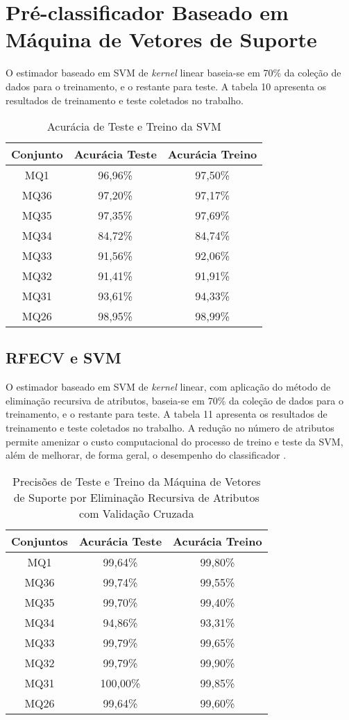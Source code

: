\documentclass[12pt,oneside,a4paper,chapter=TITLE,section=TITLE,sumario=tradicional,english,brazil]{abntex2}
\begin{document}
\section{Pré-classificador Baseado em Máquina de Vetores de Suporte}
O estimador baseado em SVM de \textit{kernel} linear baseia-se em 70\% da coleção de dados para o treinamento, e o restante para teste. A tabela 10  apresenta os resultados de treinamento e teste coletados no trabalho.\par 
\begin{table}[h]
\centering
\caption{Acurácia de Teste e Treino da SVM}
\begin{tabular}{c|c|c}
\toprule
   Conjunto &       Acurácia Teste &       Acurácia Treino \\
\midrule
 MQ1&	96,96\%&	97,50\%\\
MQ36&	97,20\%&	97,17\%\\
MQ35&	97,35\%&	97,69\%\\
MQ34&	84,72\%&	84,74\%\\
MQ33&	91,56\%&	92,06\%\\
MQ32&	91,41\%&	91,91\%\\
MQ31&	93,61\%&	94,33\%\\
MQ26&	98,95\%&	98,99\%\\
\bottomrule
\end{tabular}
\end{table}
\par 

\subsection{RFECV e SVM}
O estimador baseado em SVM de \textit{kernel} linear, com aplicação do método de eliminação recursiva de atributos, baseia-se em 70\% da coleção de dados para o treinamento, e o restante para teste. A tabela 11 apresenta os resultados de treinamento e teste coletados no trabalho. A redução no número de atributos permite amenizar o custo computacional do processo de treino e teste da SVM, além de melhorar, de forma geral, o desempenho do classificador \cite{guyon2003}. \par 

\begin{table}[h]
\centering
\caption{Precisões de Teste e Treino da Máquina de Vetores de Suporte por Eliminação Recursiva de Atributos com Validação Cruzada}
\begin{tabular}{c|c|c}
\toprule
   Conjuntos &       Acurácia Teste &       Acurácia Treino \\
\midrule
 MQ1&	99,64\%&	99,80\%\\
MQ36&	99,74\%&	99,55\%\\
MQ35&	99,70\%&	99,40\%\\
MQ34&	94,86\%&	93,31\%\\
MQ33&	99,79\%&	99,65\%\\
MQ32&	99,79\%&	99,90\%\\
MQ31&	100,00\%&	99,85\%\\
MQ26&	99,64\%&	99,60\%\\
\bottomrule
\end{tabular}
\end{table}
\end{document}
